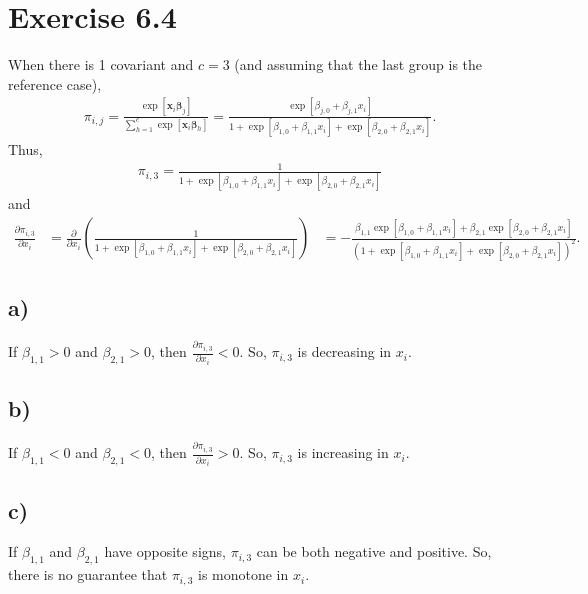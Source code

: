 \documentclass[a4paper]{article}
\begin{document}
\section{Exercise 6.4}
When there is 1 covariant and $c = 3$ (and assuming that the last group is the reference case),
\begin{align*}
\pi_{i,j} = \frac{\exp\left[\bm{x}_{i}\bm{\beta}_{j}\right]}{\sum_{h=1}^{c}\exp\left[\bm{x}_{i}\bm{\beta}_{h}\right]} = \frac{\exp\left[\beta_{j,0}+\beta_{j,1}x_{i}\right]}{1+\exp\left[\beta_{1,0}+\beta_{1,1}x_{i}\right]+\exp\left[\beta_{2,0}+\beta_{2,1}x_{i}\right]}.
\end{align*}
Thus,
\begin{align*}
\pi_{i,3} = \frac{1}{1+\exp\left[\beta_{1,0}+\beta_{1,1}x_{i}\right]+\exp\left[\beta_{2,0}+\beta_{2,1}x_{i}\right]}
\end{align*}
and
\begin{align*}
\frac{\partial \pi_{i,3}}{\partial x_{i}} &= \frac{\partial}{\partial x_{i}} \left(\frac{1}{1+\exp\left[\beta_{1,0}+\beta_{1,1}x_{i}\right]+\exp\left[\beta_{2,0}+\beta_{2,1}x_{i}\right]}\right)
&= -\frac{\beta_{1,1}\exp\left[\beta_{1,0}+\beta_{1,1}x_{i}\right]+\beta_{2,1}\exp\left[\beta_{2,0}+\beta_{2,1}x_{i}\right]}{\left(1+\exp\left[\beta_{1,0}+\beta_{1,1}x_{i}\right]+\exp\left[\beta_{2,0}+\beta_{2,1}x_{i}\right]\right)^{2}}.
\end{align*}

\vspace{\baselineskip}
\subsection{a)}
If $\beta_{1,1} > 0$ and $\beta_{2,1} > 0$, then $\frac{\partial \pi_{i,3}}{\partial x_{i}} < 0$. So, $\pi_{i,3}$ is decreasing in $x_{i}$.

\vspace{\baselineskip}
\subsection{b)}
If $\beta_{1,1} < 0$ and $\beta_{2,1} < 0$, then $\frac{\partial \pi_{i,3}}{\partial x_{i}} > 0$. So, $\pi_{i,3}$ is increasing in $x_{i}$.

\vspace{\baselineskip}
\subsection{c)}
If $\beta_{1,1}$ and $\beta_{2,1}$ have opposite signs, $\pi_{i,3}$ can be both negative and positive. So, there is no guarantee that $\pi_{i,3}$ is monotone in $x_{i}$.
\end{document}

